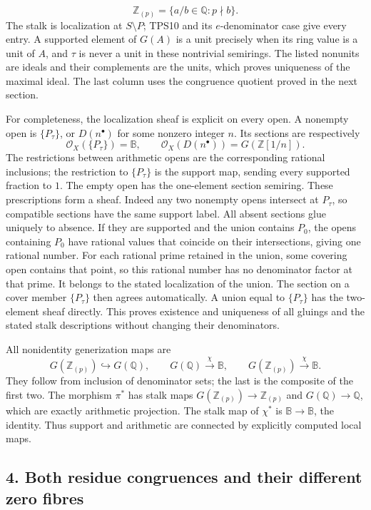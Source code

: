 \documentclass[
  10pt,
]{article}
\newcounter{none} %
\begin{document}
\[
\mathbb Z_{(p)}=\{a/b\in\mathbb Q:p\nmid b\}.
\tag{TPS11}
\] The stalk is localization at \(S\setminus P\); TPS10 and its
\(e\)-denominator case give every entry. A supported element of \(G(A)\)
is a unit precisely when its ring value is a unit of \(A\), and \(\tau\)
is never a unit in these nontrivial semirings. The listed nonunits are
ideals and their complements are the units, which proves uniqueness of
the maximal ideal. The last column uses the congruence quotient proved
in the next section.

For completeness, the localization sheaf is explicit on every open. A
nonempty open is \(\{P_\tau\}\), or \(D(n^\bullet)\) for some nonzero
integer \(n\). Its sections are respectively \[
\mathcal O_X(\{P_\tau\})=\mathbb B,\qquad
\mathcal O_X(D(n^\bullet))=G(\mathbb Z[1/n]).
\tag{TPS12}
\] The restrictions between arithmetic opens are the corresponding
rational inclusions; the restriction to \(\{P_\tau\}\) is the support
map, sending every supported fraction to \(1\). The empty open has the
one-element section semiring. These prescriptions form a sheaf. Indeed
any two nonempty opens intersect at \(P_\tau\), so compatible sections
have the same support label. All absent sections glue uniquely to
absence. If they are supported and the union contains \(P_0\), the opens
containing \(P_0\) have rational values that coincide on their
intersections, giving one rational number. For each rational prime
retained in the union, some covering open contains that point, so this
rational number has no denominator factor at that prime. It belongs to
the stated localization of the union. The section on a cover member
\(\{P_\tau\}\) then agrees automatically. A union equal to
\(\{P_\tau\}\) has the two-element sheaf directly. This proves existence
and uniqueness of all gluings and the stated stalk descriptions without
changing their denominators.

All nonidentity generization maps are \[
G(\mathbb Z_{(p)})\hookrightarrow G(\mathbb Q),\qquad
G(\mathbb Q)\xrightarrow{\chi}\mathbb B,
\qquad
G(\mathbb Z_{(p)})\xrightarrow{\chi}\mathbb B.
\tag{TPS13}
\] They follow from inclusion of denominator sets; the last is the
composite of the first two. The morphism \(\pi^*\) has stalk maps
\(G(\mathbb Z_{(p)})\to\mathbb Z_{(p)}\) and
\(G(\mathbb Q)\to\mathbb Q\), which are exactly arithmetic projection.
The stalk map of \(\chi^*\) is \(\mathbb B\to\mathbb B\), the identity.
Thus support and arithmetic are connected by explicitly computed local
maps.

\subsection{4. Both residue congruences and their different zero
fibres}\label{both-residue-congruences-and-their-different-zero-fibres}
\end{document}
